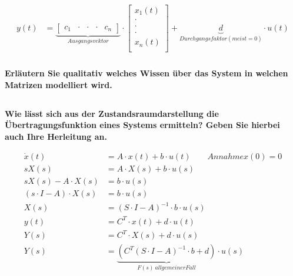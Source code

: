 \begin{equation}
\begin{aligned}
        y(t)    & =\underbrace{\left[\begin{array}{ccccc}
                    c_1 & \cdot & \cdot & \cdot & c_n
                \end{array}\right]}_{Ausgangsvektor}\cdot\left[
            \begin{array}{c}
                x_1(t) \\
                \cdot  \\
                \cdot  \\
                \cdot  \\
                x_n(t) \\
            \end{array}
            \right]+\underbrace{d}_{Durchgangsfaktor(meist=0)}\cdot u(t)
    \end{aligned}
\end{equation}

\subsubsection{}
\textbf{Erläutern Sie qualitativ welches Wissen über das System in welchen Matrizen modelliert wird.}

\subsection{}
\textbf{Wie lässt sich aus der Zustandsraumdarstellung die Übertragungsfunktion eines Systems ermitteln? Geben Sie hierbei auch Ihre Herleitung an.}

\begin{equation}
    \begin{aligned}
        \dot{x}(t)             & =A\cdot x(t)+b\cdot u(t)\qquad Annahme x(0)=0                                    \\
        sX(s)                  & =A\cdot X(s)+b\cdot u(s)                                                         \\
        sX(s)-A\cdot X(s)      & =b\cdot u(s)                                                                     \\
        (s\cdot I-A)\cdot X(s) & =b\cdot u(s)                                                                     \\
        X(s)                   & =(S\cdot I-A)^{-1}\cdot b\cdot u(s)                                              \\
        y(t)                   & =C^T\cdot x(t)+d\cdot u(t)                                                       \\
        Y(s)                   & =C^T\cdot X(s)+d\cdot u(s)                                                       \\
        Y(s)                   & =\underbrace{(C^T(S\cdot I-A)^{-1}\cdot b+d)}_{F(s)\ allgemeiner Fall}\cdot u(s)
    \end{aligned}
\end{equation}
